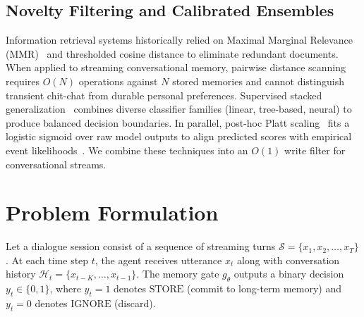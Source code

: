 \documentclass[journal]{IEEEtran}
\begin{document}
\subsection{Novelty Filtering and Calibrated Ensembles}
Information retrieval systems historically relied on Maximal Marginal Relevance (MMR)~\cite{carbonell1998mmr} and thresholded cosine distance to eliminate redundant documents. When applied to streaming conversational memory, pairwise distance scanning requires $O(N)$ operations against $N$ stored memories and cannot distinguish transient chit-chat from durable personal preferences. Supervised stacked generalization~\cite{wolpert1992stacked} combines diverse classifier families (linear, tree-based, neural) to produce balanced decision boundaries. In parallel, post-hoc Platt scaling~\cite{platt1999probabilistic} fits a logistic sigmoid over raw model outputs to align predicted scores with empirical event likelihoods~\cite{guo2017calibration}. We combine these techniques into an $O(1)$ write filter for conversational streams.

\section{Problem Formulation}
Let a dialogue session consist of a sequence of streaming turns $\mathcal{S} = \{x_1, x_2, \dots, x_T\}$. At each time step $t$, the agent receives utterance $x_t$ along with conversation history $\mathcal{H}_t = \{x_{t-K}, \dots, x_{t-1}\}$. The memory gate $g_\theta$ outputs a binary decision $y_t \in \{0, 1\}$, where $y_t = 1$ denotes $\text{STORE}$ (commit to long-term memory) and $y_t = 0$ denotes $\text{IGNORE}$ (discard).
\end{document}
